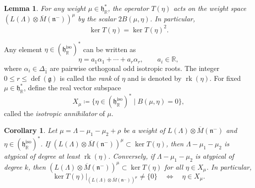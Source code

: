 \documentclass[11pt]{amsart}
\def\RR{{\mathbb R}}
\def\rk{{\operatorname{rk}}}
\def\hh{{\mathfrak h}}
\def\nn {{\mathfrak{n}}}
\def\gg{{\mathfrak{g}}}
\theoremstyle{plain}
\newtheorem{lemma}[theorem]{Lemma}
\newtheorem{corollary}[theorem]{Corollary}
\theoremstyle{remark}
\theoremstyle{definition}
\numberwithin{equation}{section}
\theoremstyle{remark}
\begin{document}
\begin{lemma}
For any weight $\mu \in \hh_{\RR}^{\ast}$, the operator $T(\eta)$ acts on the weight space
$(L(\Lambda)\otimes \overline{M}(\nn^{-}))^{\mu}$ by the scalar $2B(\mu,\eta)$. In particular,
\[
\ker T(\eta)=\ker T(\eta)^{2}.
\]
\end{lemma}



Any element $\eta\in(\hh_{\RR}^{\text{iso}})^{\ast}$ can be written as
\begin{equation}
\eta=a_{1}\alpha_{1}+\cdots+a_{r}\alpha_{r},\qquad a_{i}\in\RR,
\end{equation}
where $\alpha_{i}\in\Delta_{\bar{1}}$ are pairwise orthogonal odd isotropic roots. The integer
$0\le r\le\operatorname{def}(\gg)$ is called the \emph{rank} of $\eta$ and is denoted by $\rk(\eta)$.
For fixed $\mu\in\hh_{\RR}^{\ast}$, define the real vector subspace
\begin{equation}
X_{\mu}\coloneqq \{\eta\in(\hh_{\RR}^{\text{iso}})^{\ast}\mid B(\mu,\eta)=0\},
\end{equation}
called the \emph{isotropic annihilator} of $\mu$.

\begin{corollary} \label{cor::kernel_T}
Let $\mu=\Lambda-\mu_{1}-\mu_{2}+\rho$ be a weight of $L(\Lambda)\otimes \overline{M}(\nn^{-})$ and
$\eta\in(\hh_{\RR}^{\text{iso}})^{\ast}$. If $(L(\Lambda)\otimes \overline{M}(\nn^{-}))^{\mu}\subset\ker
T(\eta)$, then $\Lambda-\mu_{1}-\mu_{2}$ is atypical of degree at least $\rk(\eta)$. Conversely,
if $\Lambda-\mu_{1}-\mu_{2}$ is atypical of degree $k$, then
$(L(\Lambda)\otimes \overline{M}(\nn^{-}))^{\mu}\subset\ker T(\eta)$ for all $\eta\in X_{\mu}$. In
particular,
\[
\ker T(\eta)\big|_{(L(\Lambda)\otimes \overline{M}(\nn^{-}))^{\mu}}\neq\{0\}
\quad\Longleftrightarrow\quad
\eta\in X_{\mu}.
\]
\end{corollary}
\end{document}
